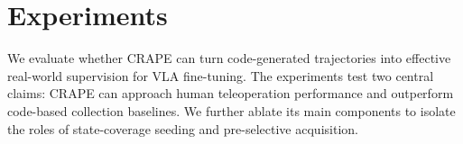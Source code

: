 \documentclass{article}
\begin{document}

        


\section{Experiments}
\label{sec:result}
We evaluate whether CRAPE can turn code-generated trajectories into effective real-world supervision for VLA fine-tuning.
The experiments test two central claims:
CRAPE can approach human teleoperation performance and outperform code-based collection baselines.
We further ablate its main components to isolate the roles of state-coverage seeding and pre-selective acquisition.

\end{document}
